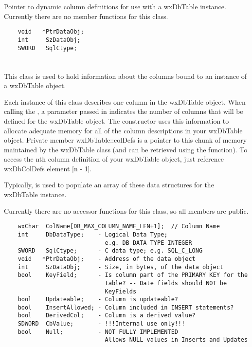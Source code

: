 \section{}\label{wxdbcoldataptr}

Pointer to dynamic column definitions for use with a wxDbTable instance.  
Currently there are no member functions for this class.

\begin{verbatim}
    void   *PtrDataObj;
    int     SzDataObj;
    SWORD   SqlCtype;
\end{verbatim}


\section{}\label{wxdbcoldef}

This class is used to hold information about the columns bound to an 
instance of a wxDbTable object.  

Each instance of this class describes one column in the wxDbTable 
object.  When calling the , a 
parameter passed in indicates the number of columns that will be defined for 
the wxDbTable object.  The constructor uses this information to allocate 
adequate memory for all of the column descriptions in your wxDbTable object.  
Private member wxDbTable::colDefs is a pointer to this chunk of memory 
maintained by the wxDbTable class (and can be retrieved using the 
 function).  
To access the nth column definition of your wxDbTable object, just reference 
wxDbColDefs element [n - 1].

Typically,  is used to 
populate an array of these data structures for the wxDbTable instance.

Currently there are no accessor functions for this class, so all members are 
public.

\begin{verbatim}
    wxChar  ColName[DB_MAX_COLUMN_NAME_LEN+1];  // Column Name
    int     DbDataType;    - Logical Data Type; 
                             e.g. DB_DATA_TYPE_INTEGER
    SWORD   SqlCtype;      - C data type; e.g. SQL_C_LONG
    void   *PtrDataObj;    - Address of the data object
    int     SzDataObj;     - Size, in bytes, of the data object
    bool    KeyField;      - Is column part of the PRIMARY KEY for the
                             table? -- Date fields should NOT be 
                             KeyFields
    bool    Updateable;    - Column is updateable?
    bool    InsertAllowed; - Column included in INSERT statements?
    bool    DerivedCol;    - Column is a derived value?
    SDWORD  CbValue;       - !!!Internal use only!!!
    bool    Null;          - NOT FULLY IMPLEMENTED
                             Allows NULL values in Inserts and Updates
\end{verbatim}

